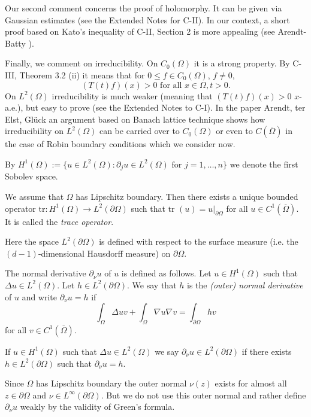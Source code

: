 Our second comment concerns the proof of holomorphy. It can be given via Gaussian estimates (see the Extended Notes for C-II). In our context, a short proof based on Kato's inequality of C-II, Section 2 is more appealing (see Arendt-Batty \cite{ArBa92}).

Finally, we comment on irreducibility. 
On $C_0(\Omega)$ it is a strong property. 
By C-III, Theorem 3.2 (ii) it means that for $0 \leq f \in C_0(\Omega)$, $f \neq 0$,
\[
(T(t)f)(x) > 0 \text{ for all } x \in \Omega, t > 0.
\]
On $L^2(\Omega)$ irreducibility is much weaker (meaning that $(T(t)f)(x) > 0$ $x$-a.e.), but easy to prove (see the Extended Notes to C-I). In the paper Arendt, ter Elst, Glück \cite{AEG20} an argument based on Banach lattice technique shows how irreducibility on $L^2(\Omega)$ can be carried over to $C_0(\Omega)$ or even to $C(\overline{\Omega})$ in the case of Robin boundary conditions which we consider now.

By $H^1(\Omega) := \{u \in L^2(\Omega) : \partial_j u \in L^2(\Omega) \text{ for } j = 1, \ldots, n\}$ we denote the first Sobolev space.

We assume that $\Omega$ has Lipschitz boundary. Then there exists a unique bounded operator $\text{tr} : H^1(\Omega) \to L^2(\partial\Omega)$ such that $\text{tr }(u) = u|_{\partial\Omega}$ for all $u \in C^1(\overline{\Omega})$. It is called the \emph{trace operator}.

Here the space $L^2(\partial\Omega)$ is defined with respect to the surface measure (i.e. the $(d-1)$-dimensional Hausdorff measure) on $\partial\Omega$.

The normal derivative $\partial_\nu u$ of $u$ is defined as follows. Let $u \in H^1(\Omega)$ such that $\Delta u \in L^2(\Omega)$. Let $h \in L^2(\partial\Omega)$. We say that $h$ is the \emph{(outer) normal derivative} of $u$ and write $\partial_\nu u = h$ if
\[\int_\Omega \Delta u v + \int_\Omega \nabla u \nabla v = \int_{\partial\Omega} h v\]
for all $v \in C^1(\overline{\Omega})$.

If $u \in H^1(\Omega)$ such that $\Delta u \in L^2(\Omega)$ we say $\partial_\nu u \in L^2(\partial\Omega)$ if there exists $h \in L^2(\partial\Omega)$ such that $\partial_\nu u = h$.

\begin{remark*}
Since $\Omega$ has Lipschitz boundary the outer normal $\nu(z)$ exists for almost all $z \in \partial\Omega$ and $\nu \in L^\infty(\partial\Omega)$. But we do not use this outer normal and rather define $\partial_\nu u$ weakly by the validity of Green's formula.
\end{remark*}

